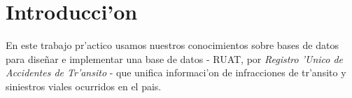 \section{Introducci'on}

En este trabajo pr'actico usamos nuestros conocimientos sobre bases de datos para diseñar e implementar una base de datos - RUAT, por \textit{Registro 'Unico de Accidentes de Tr'ansito} - que unifica informaci'on de infracciones de tr'ansito y siniestros viales ocurridos en el pais.